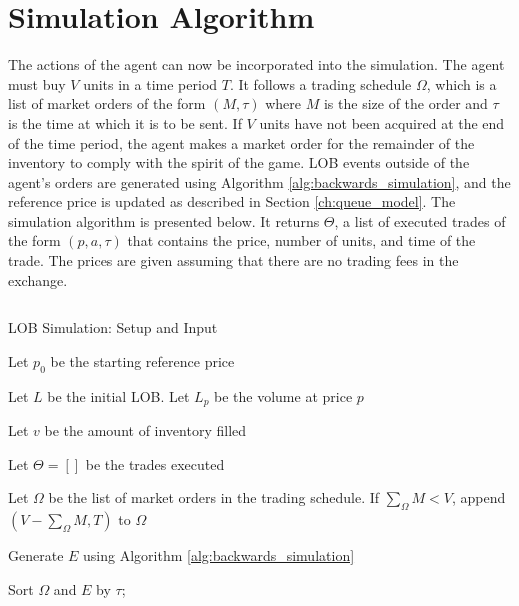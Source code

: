 \section{Simulation Algorithm} \label{ch:simulation_algorithm}

The actions of the agent can now be incorporated into the simulation. The agent must buy $V$ units in a time period $T$. It follows a trading schedule $\Omega$, which is a list of market orders of the form $(M,\tau)$ where $M$ is the size of the order and $\tau$ is the time at which it is to be sent. If $V$ units have not been acquired at the end of the time period, the agent makes a market order for the remainder of the inventory to comply with the spirit of the game. LOB events outside of the agent's orders are generated using Algorithm \ref{alg:backwards_simulation}, and the reference price is updated as described in Section \ref{ch:queue_model}. The simulation algorithm is presented below. It returns $\Theta$, a list of executed trades of the form $(p,a,\tau)$ that contains the price, number of units, and time of the trade. The prices are given assuming that there are no trading fees in the exchange.

$$ $$

\begin{algorithm}[H]
\SetAlgoLined
\caption{LOB Simulation: Setup and Input}
Let $p_0$ be the starting reference price \;

Let $L$ be the initial LOB. Let $L_p$ be the volume at price $p$ \;

Let $v$ be the amount of inventory filled \;

Let $\Theta = []$ be the trades executed \;

Let $\Omega$ be the list of market orders in the trading schedule. If $\sum\limits_\Omega{M} < V$, append $(V - \sum\limits_\Omega{M}, T)$ to $\Omega$ \;

Generate $E$ using Algorithm \ref{alg:backwards_simulation} \;

Sort $\Omega$ and $E$ by $\tau$;
\end{algorithm}

